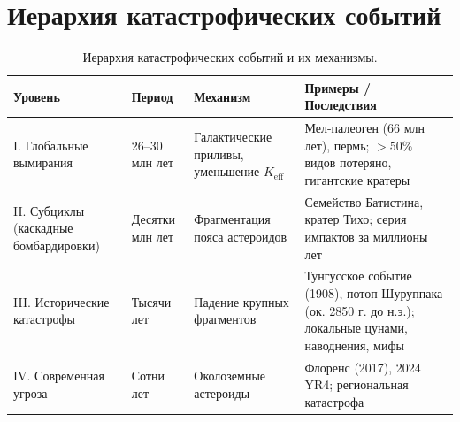 \documentclass[11pt,a4paper]{article}
\begin{document}
	\section{Иерархия катастрофических событий}
	
	\begin{table}[!ht]
		\centering
		\caption{Иерархия катастрофических событий и их механизмы.}
		\label{tab:hierarchy}
		\scriptsize
		\begin{tabular}{p{3.5cm}p{2.4cm}p{3.4cm}p{7.5cm}}
			\toprule
			\textbf{Уровень} & \textbf{Период} & \textbf{Механизм} & \textbf{Примеры / Последствия} \\
			\midrule
			I. Глобальные вымирания & 26–30 млн лет & Галактические приливы, уменьшение \(K_{\mathrm{eff}}\) & Мел-палеоген (66 млн лет), пермь; \(>50\%\) видов потеряно, гигантские кратеры \\
			II. Субциклы (каскадные бомбардировки) & Десятки млн лет & Фрагментация пояса астероидов & Семейство Батистина, кратер Тихо; серия импактов за миллионы лет \\
			III. Исторические катастрофы & Тысячи лет & Падение крупных фрагментов & Тунгусское событие (1908), потоп Шуруппака (ок. 2850 г. до н.э.); локальные цунами, наводнения, мифы \\
			IV. Современная угроза & Сотни лет & Околоземные астероиды & Флоренс (2017), 2024 YR4; региональная катастрофа \\
			\bottomrule
		\end{tabular}
	\end{table}
	
\end{document}
